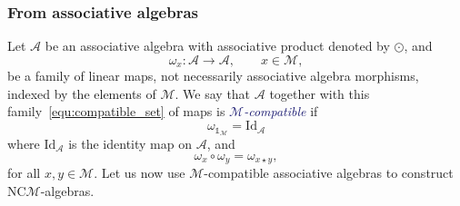 \documentclass[10pt,reqno]{amsart}
\numberwithin{equation}{subsection}
\newcommand{\Aca}{\mathcal{A}}
\newcommand{\Mca}{\mathcal{M}}
\newcommand{\NC}{\mathrm{NC}}
\newcommand{\Unit}{\mathds{1}}
\newcommand{\Op}{\star}
\newcommand{\OpAssoc}{\odot}
\newcommand{\Alg}{\Aca}
\newcommand{\Id}{\mathrm{Id}}
\newcommand{\Def}[1]{\textcolor{MidnightBlue}{\em #1}}
\begin{document}
\subsubsection{From associative algebras}
Let $\Alg$ be an associative algebra with associative product denoted by
$\OpAssoc$, and
\begin{equation} \label{equ:compatible_set}
    \omega_x : \Alg \to \Alg, \qquad x \in \Mca,
\end{equation}
be a family of linear maps, not necessarily associative algebra
morphisms, indexed by the elements of $\Mca$. We say that $\Alg$
together with this family~\eqref{equ:compatible_set} of maps is
\Def{$\Mca$-compatible} if
\begin{equation} \label{equ:compatible_magma_on_algebra_1}
    \omega_{\Unit_\Mca} = \Id_\Alg
\end{equation}
where $\Id_\Alg$ is the identity map on $\Alg$, and
\begin{equation} \label{equ:compatible_magma_on_algebra_2}
    \omega_x \circ \omega_y = \omega_{x \Op y},
\end{equation}
for all $x, y \in \Mca$. Let us now use $\Mca$-compatible associative
algebras to construct $\NC\Mca$-algebras.
\medskip
\end{document}

